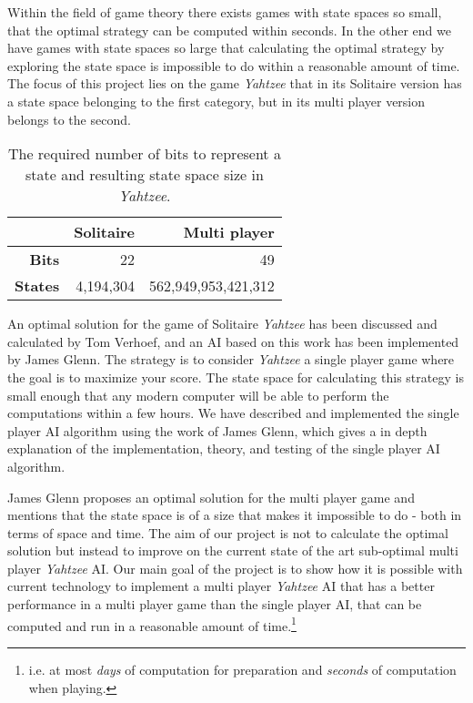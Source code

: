 Within the field of game theory there exists games with state spaces so small, that the optimal strategy can be computed within seconds. 
In the other end we have games with state spaces so large that calculating the optimal strategy by exploring the state space is impossible to do within a reasonable amount of time. 
The focus of this project lies on the game \emph{Yahtzee} that in its Solitaire version has a state space belonging to the first category, but in its multi player version belongs to the second.

\begin{table}[h] %
\centering
\begin{tabular}{|r|r|r|}
\hline
&\textbf{Solitaire} & \textbf{Multi player} 		\\ \hline
\textbf{Bits} 	& 22		&  49 					\\ \hline
\textbf{States} & 4,194,304	&  562,949,953,421,312	\\ \hline	

\end{tabular}
\caption{The required number of bits to represent a state and resulting state space size in \emph{Yahtzee}.}
\end{table}


An optimal solution for the game of Solitaire \emph{Yahtzee} has been discussed and calculated by Tom Verhoef\cite{verhoeff2004optimal}, and an AI based on this work has been implemented by James Glenn\cite{glenn2006optimal}.
The strategy is to consider \emph{Yahtzee} a single player game where the goal is to maximize your score. 
The state space for calculating this strategy is small enough that any modern computer will be able to perform the computations within a few hours.
We have described and implemented the single player AI algorithm using the work of James Glenn, which gives a in depth explanation of the implementation, theory, and testing of the single player AI algorithm.

James Glenn proposes an optimal solution for the multi player game and mentions that the state space is of a size that makes it impossible to do - both in terms of space and time.
The aim of our project is not to calculate the optimal solution but instead to improve on the current state of the art sub-optimal multi player \emph{Yahtzee} AI. 
Our main goal of the project is to show how it is possible with current technology to implement a multi player \emph{Yahtzee} AI that has a better performance in a multi player game than the single player AI, that can be computed and run in a reasonable amount of time.\footnote{i.e. at most \emph{days} of computation for preparation and \emph{seconds} of computation when playing.}

